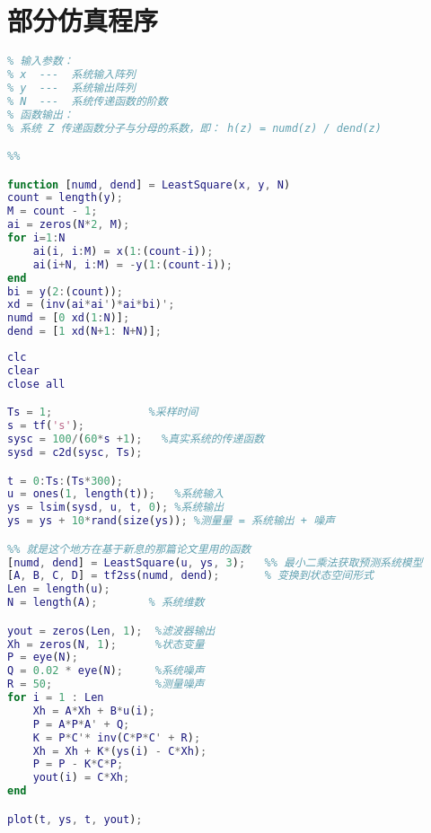 \chapter{部分仿真程序}\label{ch:fz}
\begin{lstlisting}[language=Matlab,caption={最小二乘法获取系统传递函数}]
%%
% 输入参数：
% x  ---  系统输入阵列
% y  ---  系统输出阵列
% N  ---  系统传递函数的阶数
% 函数输出：
% 系统 Z 传递函数分子与分母的系数，即： h(z) = numd(z) / dend(z)

%%

function [numd, dend] = LeastSquare(x, y, N)
count = length(y);
M = count - 1;
ai = zeros(N*2, M);
for i=1:N
    ai(i, i:M) = x(1:(count-i));
    ai(i+N, i:M) = -y(1:(count-i));
end
bi = y(2:(count));
xd = (inv(ai*ai')*ai*bi)';
numd = [0 xd(1:N)];
dend = [1 xd(N+1: N+N)];
\end{lstlisting}
\begin{lstlisting}[language=Matlab,caption={拥有精确模型的卡尔曼滤波}]
clc
clear
close all

Ts = 1;               %采样时间
s = tf('s');
sysc = 100/(60*s +1);   %真实系统的传递函数
sysd = c2d(sysc, Ts);

t = 0:Ts:(Ts*300);
u = ones(1, length(t));   %系统输入
ys = lsim(sysd, u, t, 0); %系统输出
ys = ys + 10*rand(size(ys)); %测量量 = 系统输出 + 噪声

%% 就是这个地方在基于新息的那篇论文里用的函数
[numd, dend] = LeastSquare(u, ys, 3);   %% 最小二乘法获取预测系统模型
[A, B, C, D] = tf2ss(numd, dend);       % 变换到状态空间形式
Len = length(u);
N = length(A);        % 系统维数

yout = zeros(Len, 1);  %滤波器输出
Xh = zeros(N, 1);      %状态变量
P = eye(N);
Q = 0.02 * eye(N);     %系统噪声
R = 50;                %测量噪声
for i = 1 : Len
    Xh = A*Xh + B*u(i);
    P = A*P*A' + Q;
    K = P*C'* inv(C*P*C' + R);
    Xh = Xh + K*(ys(i) - C*Xh);
    P = P - K*C*P;
    yout(i) = C*Xh;
end

plot(t, ys, t, yout);
\end{lstlisting} 